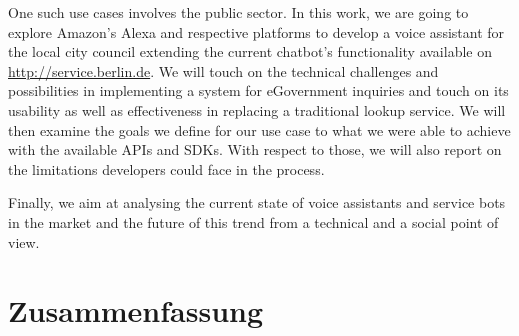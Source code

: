 One such use cases involves the public sector. In this work, we are going to explore Amazon's Alexa and respective platforms to develop a voice assistant for the local city council extending the current chatbot's functionality available on \href{ https://service.berlin.de/virtueller-assistent/virtueller-assistent-606279.php}{http://service.berlin.de}. We will touch on the technical challenges and possibilities in implementing a system for eGovernment inquiries and touch on its usability as well as effectiveness in replacing a traditional lookup service. We will then examine the goals we define for our use case to what we were able to achieve with the available APIs and SDKs. With respect to those, we will also report on the limitations developers could face in the process.

Finally, we aim at analysing the current state of voice assistants and service bots in the market and the future of this trend from a technical and a social point of view.



\newpage
\chapter*{Zusammenfassung}
 \\
\\
\\


